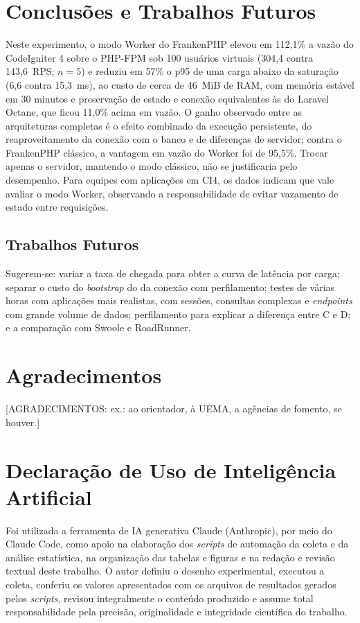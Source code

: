 \documentclass[sigconf, nonacm, screen, language=portuguese, language=spanish, language={main=english}]{acmart}
\begin{document}
\section{Conclusões e Trabalhos Futuros}
Neste experimento, o modo Worker do FrankenPHP elevou em 112,1\% a vazão do CodeIgniter 4 sobre o PHP-FPM sob 100 usuários virtuais (304,4 contra 143,6~RPS; $n=5$) e reduziu em 57\% o p95 de uma carga abaixo da saturação (6,6 contra 15,3~ms), ao custo de cerca de 46~MiB de RAM, com memória estável em 30 minutos e preservação de estado e conexão equivalentes às do Laravel Octane, que ficou 11,0\% acima em vazão. O ganho observado entre as arquiteturas completas é o efeito combinado da execução persistente, do reaproveitamento da conexão com o banco e de diferenças de servidor; contra o FrankenPHP clássico, a vantagem em vazão do Worker foi de 95,5\%. Trocar apenas o servidor, mantendo o modo clássico, não se justificaria pelo desempenho. Para equipes com aplicações em CI4, os dados indicam que vale avaliar o modo Worker, observando a responsabilidade de evitar vazamento de estado entre requisições.

\subsection{Trabalhos Futuros}
Sugerem-se: variar a taxa de chegada para obter a curva de latência por carga; separar o custo do \textit{bootstrap} do da conexão com perfilamento; testes de várias horas com aplicações mais realistas, com sessões, consultas complexas e \textit{endpoints} com grande volume de dados; perfilamento para explicar a diferença entre C e D; e a comparação com Swoole e RoadRunner.

\section*{Agradecimentos}
[AGRADECIMENTOS: ex.: ao orientador, à UEMA, a agências de fomento, se houver.]

\section*{Declaração de Uso de Inteligência Artificial}
Foi utilizada a ferramenta de IA generativa Claude (Anthropic), por meio do Claude Code, como apoio na elaboração dos \textit{scripts} de automação da coleta e da análise estatística, na organização das tabelas e figuras e na redação e revisão textual deste trabalho. O autor definiu o desenho experimental, executou a coleta, conferiu os valores apresentados com os arquivos de resultados gerados pelos \textit{scripts}, revisou integralmente o conteúdo produzido e assume total responsabilidade pela precisão, originalidade e integridade científica do trabalho.
\end{document}
